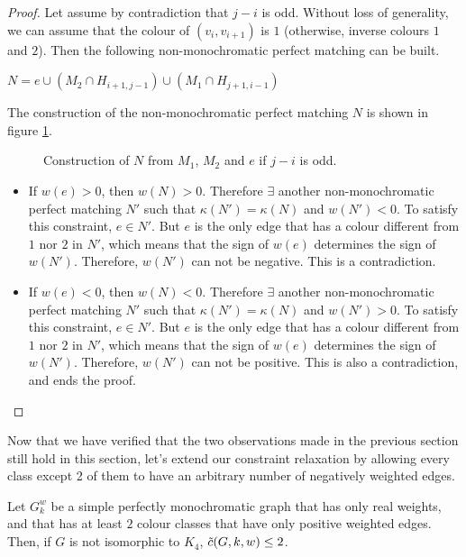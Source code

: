 \begin{proof}
    Let assume by contradiction that $j-i$ is odd. Without loss of generality, we can assume that the colour of $(v_i, v_{i+1})$ is $1$ (otherwise, inverse colours $1$ and $2$). Then the following non-monochromatic perfect matching can be built.

    \begin{center}
        $N = e \cup (M_2 \cap H_{i+1, j-1}) \cup (M_1 \cap H_{j+1, i-1})$
    \end{center}

    The construction of the non-monochromatic perfect matching $N$ is shown in figure \ref{fig:2_pos_classes_odd_crossings}.

    \begin{figure}[H]
        \caption{Construction of $N$ from $M_1$, $M_2$ and $e$ if $j-i$ is odd.}
        \label{fig:2_pos_classes_odd_crossings}
    \end{figure}

    \begin{itemize}
        \item If $w(e) > 0$, then $w(N) > 0$. Therefore $\exists$ another non-monochromatic perfect matching $N'$ such that $\kappa(N') = \kappa(N)$ and $w(N') < 0$. To satisfy this constraint, $e \in N'$. But $e$ is the only edge that has a colour different from $1$ nor $2$ in $N'$, which means that the sign of $w(e)$ determines the sign of $w(N')$. Therefore, $w(N')$ can not be negative. This is a contradiction.

        \item If $w(e) < 0$, then $w(N) < 0$. Therefore $\exists$ another non-monochromatic perfect matching $N'$ such that $\kappa(N') = \kappa(N)$ and $w(N') > 0$. To satisfy this constraint, $e \in N'$. But $e$ is the only edge that has a colour different from $1$ nor $2$ in $N'$, which means that the sign of $w(e)$ determines the sign of $w(N')$. Therefore, $w(N')$ can not be positive. This is also a contradiction, and ends the proof.
    \end{itemize}
\end{proof}

Now that we have verified that the two observations made in the previous section still hold in this section, let's extend our constraint relaxation by allowing every class except 2 of them to have an arbitrary number of negatively weighted edges.

\begin{lemma}
    \label{lem:2_positive_colour_classes_forbidden}
    Let $G_k^w$ be a simple perfectly monochromatic graph that has only real weights, and that has at least $2$ colour classes that have only positive weighted edges. Then, if $G$ is not isomorphic to $K_4$, $\Tilde{c}(G, k, w) \leq 2$.
\end{lemma}

